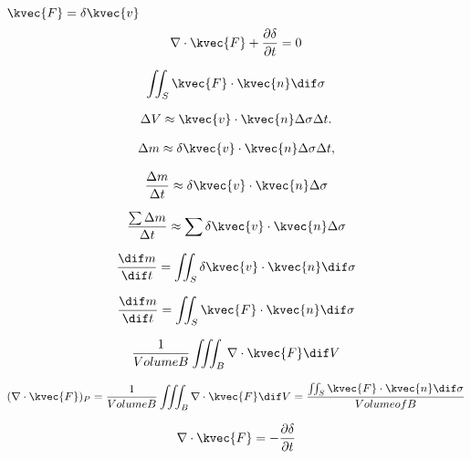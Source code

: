 \( \kvec{F} = \delta \kvec{v} \) \\

\begin{align*}
\nabla \cdot \kvec{F} + \frac{\partial \delta}{\partial t} = 0
\end{align*}

\begin{align*}
\iint_S \kvec{F} \cdot \kvec{n} \dif \sigma
\end{align*}

\begin{align*}
\Delta V \approx \kvec{v} \cdot \kvec{n} \Delta \sigma \Delta t.
\end{align*}

\begin{align*}
\Delta m \approx \delta \kvec{v} \cdot \kvec{n} \Delta \sigma \Delta t,
\end{align*}

\begin{align*}
\frac{\Delta m}{\Delta t} \approx \delta \kvec{v} \cdot \kvec{n} \Delta \sigma
\end{align*}

\begin{align*}
\frac{\sum \Delta m}{\Delta t} \approx \sum \delta \kvec{v} \cdot \kvec{n} \Delta \sigma
\end{align*}

\begin{align*}
\frac{\dif m}{\dif t} = \iint_S \delta \kvec{v} \cdot \kvec{n} \dif \sigma
\end{align*}

\begin{align*}
\frac{\dif m}{\dif t} = \iint_S \kvec{F} \cdot \kvec{n} \dif \sigma 
\end{align*}

\begin{align*}
\frac{1}{ Volume B} \iiint_B  \nabla \cdot  \kvec{F} \dif V
\end{align*}


\begin{align*}
( \nabla \cdot \kvec{F} )_P = \frac{1}{Volume B} \iiint_B \nabla \cdot \kvec{F} \dif V = \frac{\iint_S \kvec{F} \cdot \kvec{n} \dif \sigma}{Volume of B}
\end{align*}

\begin{align*}
\nabla \cdot \kvec{F} = - \frac{\partial \delta}{\partial t} 
\end{align*}

